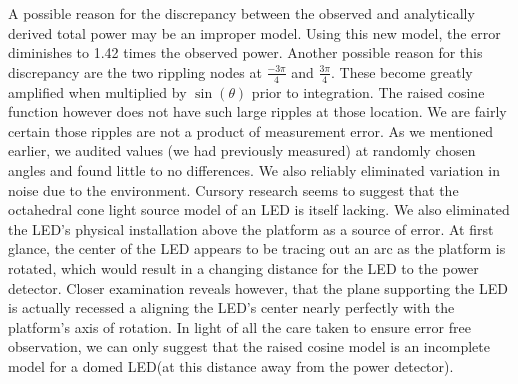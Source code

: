 A possible reason for the discrepancy between the observed and analytically derived total power may be an improper model. Using this new model, the error diminishes to 1.42 times the observed power. Another possible reason for this discrepancy are the two rippling nodes at $\frac{-3\pi}{4}$ and $\frac{3\pi}{4}$. These become greatly amplified when multiplied by $\sin(\theta)$ prior to integration. The raised cosine function however does not have such large ripples at those location. We are fairly certain those ripples are not a product of measurement error. As we mentioned earlier, we audited values (we had previously measured) at randomly chosen angles and found little to no differences. We also reliably eliminated variation in noise due to the environment. 
\newline 
Cursory research seems to suggest that the octahedral cone light source model of an LED is itself lacking. We also eliminated the LED's physical installation above the platform as a source of error. At first glance, the center of the LED appears to be tracing out an arc as the platform is rotated, which would result in a changing distance for the LED to the power detector. Closer examination reveals however, that the plane supporting the LED is actually recessed a aligning the LED's center nearly perfectly with the platform's axis of rotation. In light of all the care taken to ensure error free observation, we can only suggest that the raised cosine model is an incomplete model for a domed LED(at this distance away from the power detector).